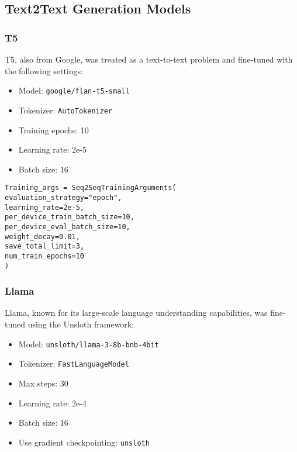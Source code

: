 \documentclass[conference]{IEEEtran}
\begin{document}
    \subsection{Text2Text Generation Models}

        \subsubsection{T5}

            T5, also from Google, was treated as a text-to-text problem and fine-tuned with the following settings:
            \begin{itemize}
                \item Model: \texttt{google/flan-t5-small}
                \item Tokenizer: \texttt{AutoTokenizer}
                \item Training epochs: 10
                \item Learning rate: 2e-5
                \item Batch size: 16
            \end{itemize}

            \begin{verbatim}
Training_args = Seq2SeqTrainingArguments(
evaluation_strategy="epoch",
learning_rate=2e-5,
per_device_train_batch_size=10,
per_device_eval_batch_size=10,
weight_decay=0.01,
save_total_limit=3,
num_train_epochs=10
)
            \end{verbatim}

        \subsubsection{Llama}

            Llama, known for its large-scale language understanding capabilities, was fine-tuned using the Unsloth framework:
            \begin{itemize}
                \item Model: \texttt{unsloth/llama-3-8b-bnb-4bit}
                \item Tokenizer: \texttt{FastLanguageModel}
                \item Max steps: 30
                \item Learning rate: 2e-4
                \item Batch size: 16
                \item Use gradient checkpointing: \texttt{unsloth}
            \end{itemize}
\end{document}
